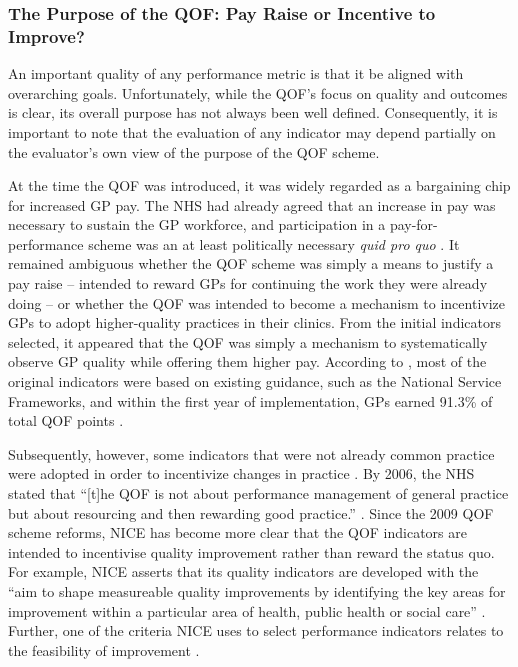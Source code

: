 \documentclass[12pt]{article}
\begin{document}
\subsubsection{The Purpose of the QOF: Pay Raise or Incentive to Improve?}

An important quality of any performance metric is that it be aligned with overarching goals. Unfortunately, while the QOF's focus on quality and outcomes is clear, its overall purpose has not always been well defined. Consequently, it is important to note that the evaluation of any indicator may depend partially on the evaluator's own view of the purpose of the QOF scheme.

At the time the QOF was introduced, it was widely regarded as a bargaining chip for increased GP pay. The NHS had already agreed that an increase in pay was necessary to sustain the GP workforce, and participation in a pay-for-performance scheme was an at least politically necessary \emph{quid pro quo} \citep{rolandQualityOutcomesFramework2016}. It remained ambiguous whether the QOF scheme was simply a means to justify a pay raise -- intended to reward GPs for continuing the work they were already doing -- or whether the QOF was intended to become a mechanism to incentivize GPs to adopt higher-quality practices in their clinics. From the initial indicators selected, it appeared that the QOF was simply a mechanism to systematically observe GP quality while offering them higher pay. According to  \citet{rolandQualityOutcomesFramework2007}, most of the original indicators were based on existing guidance, such as the National Service Frameworks, and within the first year of implementation, GPs earned 91.3\% of total QOF points \citep{dixonQualityOutcomesFramework2011}.

Subsequently, however, some indicators that were not already common practice were adopted in order to incentivize changes in practice \citep{rolandQualityOutcomesFramework2016}. By 2006, the NHS stated that ``[t]he QOF is not about performance management of general practice but about resourcing and then rewarding good practice.'' \citep{nationalhealthserviceNationalQualityOutcomes2006}. Since the 2009 QOF scheme reforms, NICE has become more clear that the QOF indicators are intended to incentivise quality improvement rather than reward the status quo. For example, NICE asserts that its quality indicators are developed with the ``aim to shape measureable quality improvements by identifying the key areas for improvement within a particular area of health, public health or social care'' \citep{bennettNICEProcessDeveloping2014}. Further, one of the criteria NICE uses to select performance indicators relates to the feasibility of improvement \citep{nationalinstituteforhealthandcareexcellenceHealthSocialCare2017}.
\end{document}
